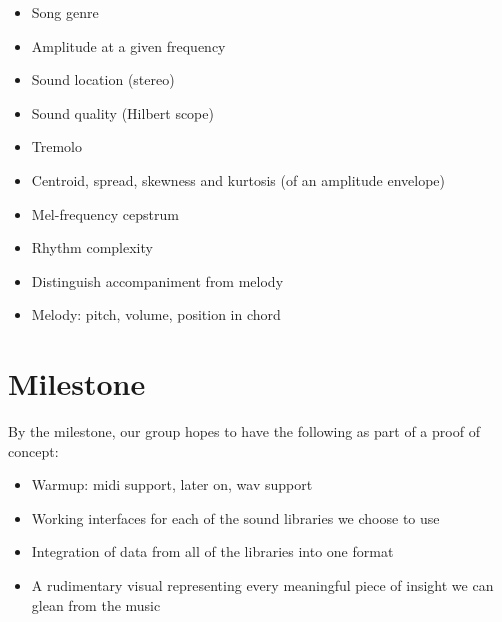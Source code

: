 \documentclass{article}
\begin{document}
\begin{itemize}
	\item Song genre
	\item Amplitude at a given frequency
	\item Sound location (stereo)
	\item Sound quality (Hilbert scope)
	\item Tremolo
	\item Centroid, spread, skewness and kurtosis (of an amplitude envelope)
	\item Mel-frequency cepstrum
	\item Rhythm complexity
	\item Distinguish accompaniment from melody
	\item Melody: pitch, volume, position in chord
\end{itemize}

\section{Milestone}

By the milestone, our group hopes to have the following as part of a proof of concept:

\begin{itemize}
	\item Warmup: midi support, later on, wav support
	\item Working interfaces for each of the sound libraries we choose to use
	\item Integration of data from all of the libraries into one format
	\item A rudimentary visual representing every meaningful piece of insight we can glean from the music
\end{itemize}
\end{document}
